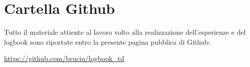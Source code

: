 
















\tableofcontents

\section{Cartella Github}
Tutto il materiale attiente al lavoro volto alla realizzazione dell'esperienze e del logbook sono riportate entro la presente pagina pubblica di Github:
\begin{center}
\textcolor{airforceblue}{\url{https://github.com/bruciu/logbook_td}}

\end{center}

\newpage





%

%




%
%
%
%
%
%
%
